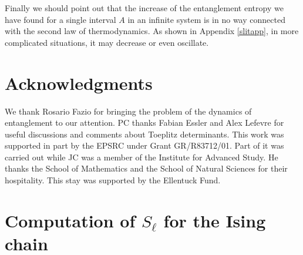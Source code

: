 \documentclass[12pt,preprint,tighten,eqsecnum,aps,floats,psfig,epsfig,amsmath,onecolumn]{revtex4-1}
\begin{document}
Finally we should point out that the increase of the entanglement
entropy we have found
for a single interval $A$ in an infinite system is in no way
connected with the second law of thermodynamics. As shown in Appendix
\ref{slitapp}, in more complicated situations, it may decrease or even 
oscillate.











\section*{Acknowledgments}
We thank Rosario Fazio for bringing the problem of the dynamics of 
entanglement to our attention.
PC thanks Fabian Essler and Alex Lefevre for useful discussions and comments 
about Toeplitz determinants.
This work was supported in part by the EPSRC under Grant GR/R83712/01.
Part of it was carried out while JC was a member of the Institute
for Advanced Study.
He thanks the School of Mathematics and the School of Natural Sciences
for their hospitality.
This stay was supported by the Ellentuck Fund.







\appendix

\section{Computation of $S_\ell$ for the Ising chain}
\label{app}
\end{document}
